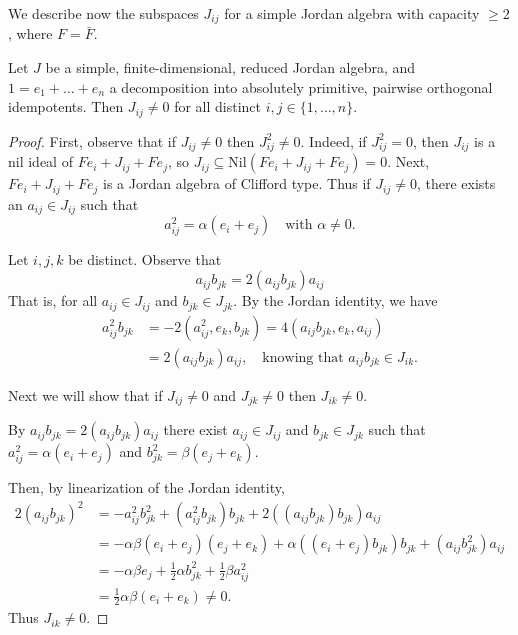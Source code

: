 \documentclass{article}
\begin{document}
We describe now the subspaces $J_{ij}$ for a simple Jordan algebra with capacity $\ge 2$, where $F=\bar{F}$.  

\begin{lemma}  
Let $J$ be a simple, finite-dimensional, reduced Jordan algebra, and $1=e_1+\dots+e_n$ a decomposition into absolutely primitive, pairwise orthogonal idempotents. Then $J_{ij} \ne 0$ for all distinct $i,j \in \{1, \dots, n\}$.  
\end{lemma} 

\begin{proof}  
First, observe that if $J_{ij} \ne 0$ then $J_{ij}^2 \ne 0$. Indeed, if $J_{ij}^2=0$, then $J_{ij}$ is a nil ideal of $Fe_i+J_{ij}+Fe_j$, so $J_{ij} \subseteq \mathrm{Nil}(Fe_i+J_{ij}+Fe_j) = 0$. Next, $Fe_i+J_{ij}+Fe_j$ is a Jordan algebra of Clifford type. Thus if $J_{ij} \ne 0$, there exists an $a_{ij} \in J_{ij}$ such that  
\[ a_{ij}^2 = \alpha(e_i+e_j) \quad \text{with } \alpha \ne 0. \]  

Let $i,j,k$ be distinct. Observe that  
\begin{equation*}  
    a_{ij}  b_{jk} = 2(a_{ij} b_{jk})a_{ij}  
\end{equation*}  
That is, for all $a_{ij} \in J_{ij}$ and $b_{jk} \in J_{jk}$.  
By the Jordan identity, we have
\begin{align*}  
    a_{ij}^2 b_{jk} &= -2(a_{ij}^2, e_k, b_{jk}) = 4(a_{ij}b_{jk}, e_k, a_{ij}) \\
    &= 2(a_{ij}b_{jk})a_{ij}, \quad \text{knowing that } a_{ij}b_{jk} \in J_{ik}.  
\end{align*}  

Next we will show that if $J_{ij} \ne 0$ and $J_{jk} \ne 0$ then $J_{ik} \ne 0$. 

By $ a_{ij}  b_{jk} = 2(a_{ij} b_{jk})a_{ij}  $ there exist $a_{ij} \in J_{ij}$ and $b_{jk} \in J_{jk}$ such that  
$a_{ij}^2 = \alpha(e_i+e_j)$ and $b_{jk}^2 = \beta(e_j+e_k)$.  

Then, by linearization of the Jordan identity,  
\begin{align*}  
    2(a_{ij}b_{jk})^2 &= -a_{ij}^2 b_{jk}^2 + (a_{ij}^2 b_{jk})b_{jk} + 2((a_{ij}b_{jk})b_{jk})a_{ij} \\
    &= -\alpha\beta(e_i+e_j)(e_j+e_k) + \alpha((e_i+e_j)b_{jk})b_{jk} + (a_{ij}b_{jk}^2)a_{ij} \\
    &= -\alpha\beta e_j + \frac{1}{2}\alpha b_{jk}^2 + \frac{1}{2}\beta a_{ij}^2  \\
    &= \frac{1}{2}\alpha\beta(e_i+e_k) \ne 0.  
\end{align*}  
Thus $J_{ik} \ne 0$.  


\end{proof}
\end{document}
